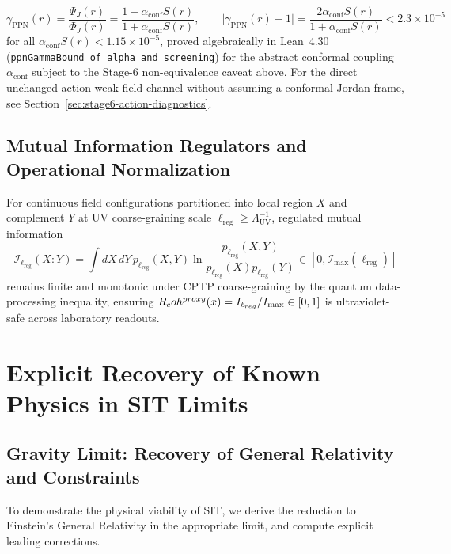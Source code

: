 \begin{equation}
\gamma_{\mathrm{PPN}}(r) = \frac{\Psi_J(r)}{\Phi_J(r)} = \frac{1 - \alpha_{\mathrm{conf}}S(r)}{1 + \alpha_{\mathrm{conf}}S(r)},
\qquad
\bigl|\gamma_{\mathrm{PPN}}(r) - 1\bigr| = \frac{2\alpha_{\mathrm{conf}}S(r)}{1 + \alpha_{\mathrm{conf}}S(r)} < 2.3 \times 10^{-5}
\end{equation}
for all $\alpha_{\mathrm{conf}} S(r) < 1.15 \times 10^{-5}$, proved algebraically in Lean~4.30 (\texttt{ppn\allowbreak{}Gamma\allowbreak{}Bound\_\allowbreak{}of\_\allowbreak{}alpha\_\allowbreak{}and\_\allowbreak{}screening}) for the abstract conformal coupling $\alpha_{\mathrm{conf}}$ subject to the Stage-6 non-equivalence caveat above. For the direct unchanged-action weak-field channel without assuming a conformal Jordan frame, see Section~\ref{sec:stage6-action-diagnostics}.

\subsection{Mutual Information Regulators and Operational Normalization}

For continuous field configurations partitioned into local region $X$ and complement $Y$ at UV coarse-graining scale $\ell_{\mathrm{reg}} \ge \Lambda_{\mathrm{UV}}^{-1}$, regulated mutual information
\[
\mathcal{I}_{\ell_{\mathrm{reg}}}(X : Y) = \int dX\,dY\,p_{\ell_{\mathrm{reg}}}(X,Y)\ln\frac{p_{\ell_{\mathrm{reg}}}(X,Y)}{p_{\ell_{\mathrm{reg}}}(X)p_{\ell_{\mathrm{reg}}}(Y)} \in [0, \mathcal{I}_{\max}(\ell_{\mathrm{reg}})]
\]
remains finite and monotonic under CPTP coarse-graining by the quantum data-processing inequality, ensuring $R_coh^{proxy}(x) = I_{\ell_{reg}}/I_{\max} \in [0,1]$ is ultraviolet-safe across laboratory readouts.

\section{Explicit Recovery of Known Physics in SIT Limits}

\subsection{Gravity Limit: Recovery of General Relativity and Constraints}
\label{app:GRlimit}

To demonstrate the physical viability of SIT, we derive the reduction to Einstein's General Relativity in the appropriate limit, and compute explicit leading corrections.

